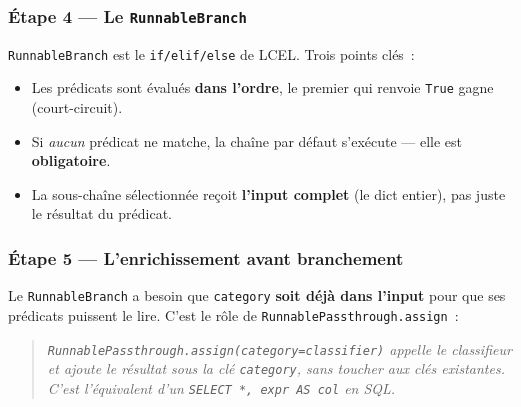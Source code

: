 \documentclass[11pt,a4paper]{article}
\begin{document}
\subsubsection*{Étape 4 — Le \texttt{RunnableBranch}}

\texttt{RunnableBranch} est le \texttt{if/elif/else} de LCEL. Trois
points clés~:

\begin{itemize}[leftmargin=*]
  \item Les prédicats sont évalués \textbf{dans l'ordre}, le premier qui
        renvoie \texttt{True} gagne (court-circuit).
  \item Si \emph{aucun} prédicat ne matche, la chaîne par défaut s'exécute
        — elle est \textbf{obligatoire}.
  \item La sous-chaîne sélectionnée reçoit \textbf{l'input complet} (le
        dict entier), pas juste le résultat du prédicat.
\end{itemize}

\subsubsection*{Étape 5 — L'enrichissement avant branchement}

Le \texttt{RunnableBranch} a besoin que \texttt{category} \textbf{soit
déjà dans l'input} pour que ses prédicats puissent le lire. C'est le rôle
de \texttt{RunnablePassthrough.assign}~:

\begin{quote}\itshape
\texttt{RunnablePassthrough.assign(category=classifier)} appelle le
classifieur et ajoute le résultat sous la clé \texttt{category}, sans
toucher aux clés existantes. C'est l'équivalent d'un
\texttt{SELECT *, expr AS col} en SQL.
\end{quote}
\end{document}

